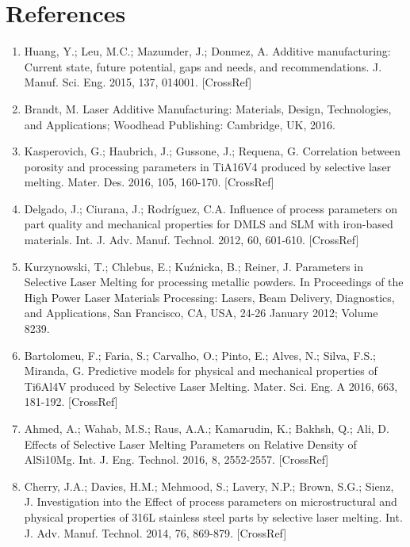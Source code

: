 \documentclass[10pt]{article}
\begin{document}
\section*{References}
\begin{enumerate}
  \item Huang, Y.; Leu, M.C.; Mazumder, J.; Donmez, A. Additive manufacturing: Current state, future potential, gaps and needs, and recommendations. J. Manuf. Sci. Eng. 2015, 137, 014001. [CrossRef]

  \item Brandt, M. Laser Additive Manufacturing: Materials, Design, Technologies, and Applications; Woodhead Publishing: Cambridge, UK, 2016.

  \item Kasperovich, G.; Haubrich, J.; Gussone, J.; Requena, G. Correlation between porosity and processing parameters in TiA16V4 produced by selective laser melting. Mater. Des. 2016, 105, 160-170. [CrossRef]

  \item Delgado, J.; Ciurana, J.; Rodríguez, C.A. Influence of process parameters on part quality and mechanical properties for DMLS and SLM with iron-based materials. Int. J. Adv. Manuf. Technol. 2012, 60, 601-610. [CrossRef]

  \item Kurzynowski, T.; Chlebus, E.; Kuźnicka, B.; Reiner, J. Parameters in Selective Laser Melting for processing metallic powders. In Proceedings of the High Power Laser Materials Processing: Lasers, Beam Delivery, Diagnostics, and Applications, San Francisco, CA, USA, 24-26 January 2012; Volume 8239.

  \item Bartolomeu, F.; Faria, S.; Carvalho, O.; Pinto, E.; Alves, N.; Silva, F.S.; Miranda, G. Predictive models for physical and mechanical properties of Ti6Al4V produced by Selective Laser Melting. Mater. Sci. Eng. A 2016, 663, 181-192. [CrossRef]

  \item Ahmed, A.; Wahab, M.S.; Raus, A.A.; Kamarudin, K.; Bakhsh, Q.; Ali, D. Effects of Selective Laser Melting Parameters on Relative Density of AlSi10Mg. Int. J. Eng. Technol. 2016, 8, 2552-2557. [CrossRef]

  \item Cherry, J.A.; Davies, H.M.; Mehmood, S.; Lavery, N.P.; Brown, S.G.; Sienz, J. Investigation into the Effect of process parameters on microstructural and physical properties of 316L stainless steel parts by selective laser melting. Int. J. Adv. Manuf. Technol. 2014, 76, 869-879. [CrossRef]


\end{enumerate}
\end{document}
